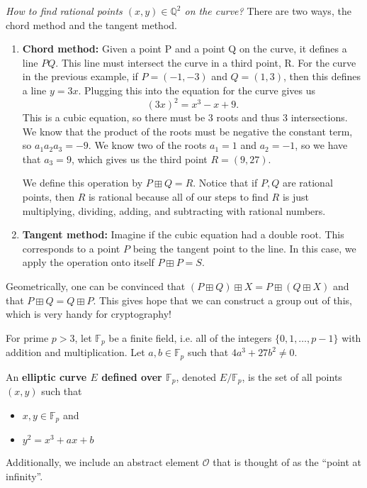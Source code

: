 \textit{How to find rational points $(x,y) \in \mathbb{Q}^2$ on the curve?} There are two ways, the chord method and the tangent method.
\begin{enumerate}
    \item \textbf{Chord method:} Given a point P and a point Q on the curve, it defines a line $PQ$. This line must intersect the curve in a third point, R. For the curve in the previous example, if $P=(-1, -3)$ and $Q=(1, 3)$, then this defines a line $y=3x$. Plugging this into the equation for the curve gives us
    $$(3x)^2 = x^3 - x + 9.$$
    This is a cubic equation, so there must be 3 roots and thus 3 intersections. We know that the product of the roots must be negative the constant term, so $a_1 a_2 a_3 = -9$. We know two of the roots $a_1 = 1$ and $a_2 = -1$, so we have that $a_3 = 9$, which gives us the third point $R = (9, 27)$.

    We define this operation by $P \boxplus Q = R$. Notice that if $P, Q$ are rational points, then $R$ is rational because all of our steps to find $R$ is just multiplying, dividing, adding, and subtracting with rational numbers.

    \begin{center}
        \def\svgwidth{0.35\linewidth}
        
    \end{center}


    \pagebreak
    \item \textbf{Tangent method:} Imagine if the cubic equation had a double root. This corresponds to a point $P$ being the tangent point to the line. In this case, we apply the operation onto itself $P \boxplus P = S$.

    \begin{center}
        \def\svgwidth{0.35\linewidth}
        
    \end{center}
\end{enumerate}

Geometrically, one can be convinced that $(P \boxplus Q) \boxplus X = P \boxplus (Q\boxplus X)$ and that $P \boxplus Q = Q \boxplus P$. This gives hope that we can construct a group out of this, which is very handy for cryptography!

\begin{definition}
    For prime $p >3$, let $\mathbb{F}_p$ be a finite field, i.e. all of the integers $\{0, 1, \dots, p-1\}$ with addition and multiplication. Let $a, b \in \mathbb{F}_p$ such that $4a^3 + 27b^2 \neq 0$.
    
    An \textbf{elliptic curve $E$ defined over $\mathbb{F}_p$}, denoted $E / \mathbb{F}_p$, is the set of all points $(x,y)$ such that
    \begin{itemize}
        \item $x,y \in \mathbb{F}_p$ and
        \item $y^2 = x^3 + ax +b$
    \end{itemize}

    Additionally, we include an abstract element $\mathcal{O}$ that is thought of as the ``point at infinity''.
\end{definition}

